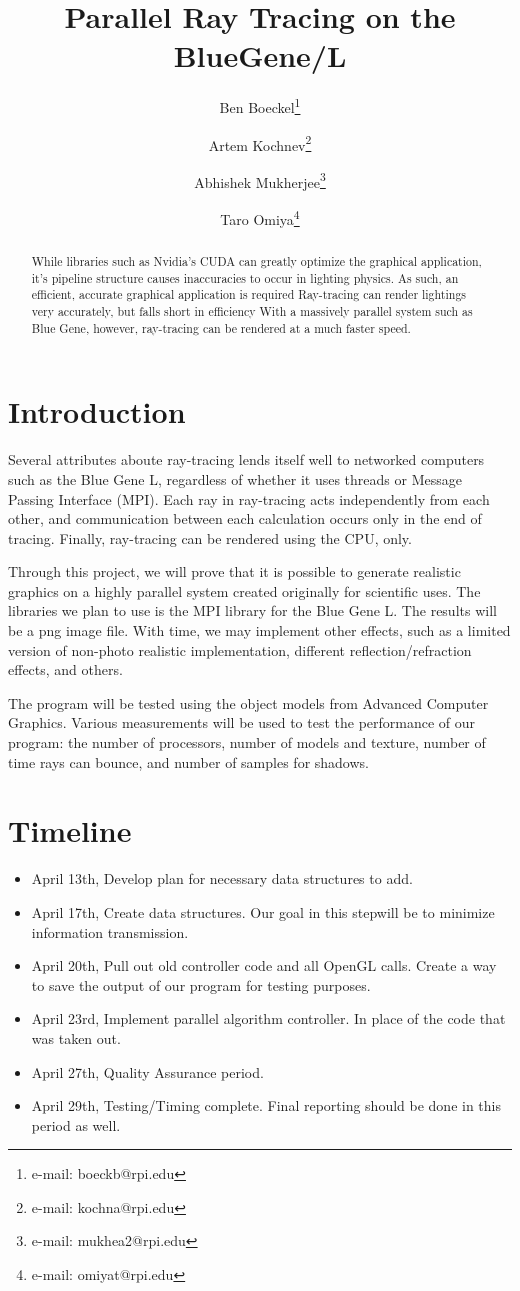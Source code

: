 \documentclass{acmsiggraph}
\title{Parallel Ray Tracing on the BlueGene/L}
\author{%
Ben Boeckel\thanks{e-mail: boeckb@rpi.edu} %
\and Artem Kochnev\thanks{e-mail: kochna@rpi.edu} %
\and Abhishek Mukherjee\thanks{e-mail: mukhea2@rpi.edu} %
\and Taro Omiya\thanks{e-mail: omiyat@rpi.edu}}
\begin{document}
\maketitle

\begin{abstract}
While libraries such as Nvidia's CUDA can greatly optimize the graphical
application, it's pipeline structure causes inaccuracies to occur in lighting
physics.  As such, an efficient, accurate graphical application is required
Ray-tracing can render lightings very accurately, but falls short in efficiency
With a massively parallel system such as Blue Gene, however, ray-tracing can be
rendered at a much faster speed.
\end{abstract}
\keywordlist

\section{Introduction}
Several attributes aboute ray-tracing lends itself well to networked computers
such as the Blue Gene L, regardless of whether it uses threads or Message
Passing Interface (MPI).  Each ray in ray-tracing acts independently from each
other, and communication between each calculation occurs only in the end of
tracing.  Finally, ray-tracing can be rendered using the CPU, only.

Through this project, we will prove that it is possible to generate realistic
graphics on a highly parallel system created originally for scientific uses.
The libraries we plan to use is the MPI library for the Blue Gene L.
The results will be a png image file.  With time, we may implement other
effects, such as a limited version of non-photo realistic implementation,
different reflection/refraction effects, and others.

The program will be tested using the object models from Advanced Computer
Graphics.  Various measurements will be used to test the performance of our
program: the number of processors, number of models and texture, number of time
rays can bounce, and number of samples for shadows.

\section*{Timeline}
\begin{itemize}
\item April 13th, Develop plan for necessary data structures to add. 
\item April 17th, Create data structures. Our goal in this stepwill be to
minimize information transmission.
\item April 20th, Pull out old controller code and all OpenGL calls. Create a
way to save the output of our program for testing purposes. 
\item April 23rd, Implement parallel algorithm controller. In place of the code
that was taken out.
\item April 27th, Quality Assurance period.
\item April 29th, Testing/Timing complete. Final reporting should be done in
this period as well.
\end{itemize}
\end{document}
